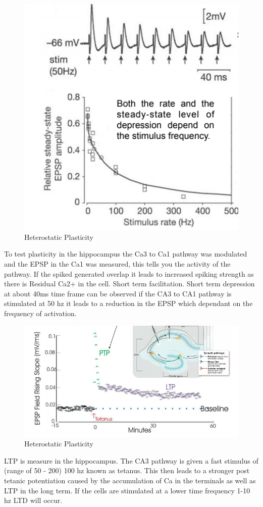 \documentclass[main]{subfiles}
\begin{document}
\begin{figure}[H]
    \centering
    \includegraphics[width=.6\textwidth]{03_PlasticityInTheBrain/figures/pasted_image_10.png}
    \caption{Heterostatic Plasticity}
    \label{fig:syn_plas1t}
\end{figure}

To test plasticity in the hippocampus the Ca3 to Ca1 pathway was modulated and the EPSP in the Ca1 was measured, this tells you the activity of the pathway. If the spiked generated overlap it leads to increased spiking strength as there is Residual Ca2+ in the cell. Short term facilitation. Short term depression at about 40ms time frame can be observed if the CA3 to CA1 pathway is stimulated at 50 hz it leads to a reduction in the EPSP which dependant on the frequency of activation.

\begin{figure}[H]
    \centering
    \includegraphics[width=.8\textwidth]{03_PlasticityInTheBrain/figures/pasted_image_11.png}
    \caption{Heterostatic Plasticity}
    \label{fig:syn_plas1t}
\end{figure}


LTP is measure in the hippocampus. The CA3 pathway is given a fast stimulus of (range of 50 - 200) 100 hz known as tetanus. This then leads to a stronger post tetanic potentiation caused by the accumulation of Ca in the terminals as well as LTP in the long term. If the cells are stimulated at a lower time frequency 1-10 hz LTD will occur. 
\end{document}
